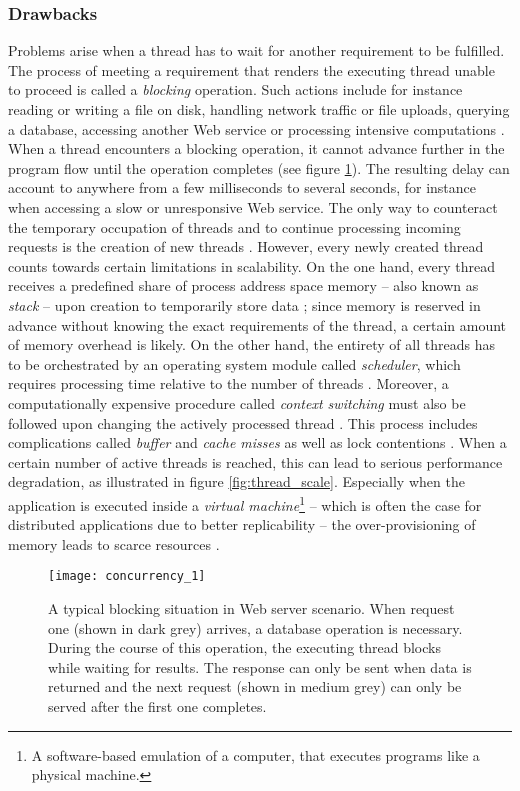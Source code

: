 \subsubsection*{Drawbacks}
Problems arise when a thread has to wait for another requirement to be fulfilled. The process of meeting a requirement that renders the executing thread unable to proceed is called a \textit{blocking} operation. Such actions include for instance reading or writing a file on disk, handling network traffic or file uploads, querying a database, accessing another Web service or processing intensive computations \cite[p. 196]{Henderson2006}. When a thread encounters a blocking operation, it cannot advance further in the program flow until the operation completes (see figure \ref{fig:concurrency_1}). The resulting delay can account to anywhere from a few milliseconds to several seconds, for instance when accessing a slow or unresponsive Web service. The only way to counteract the temporary occupation of threads and to continue processing incoming requests is the creation of new threads \cite[p. 36]{Hughes-Croucher2012}. However, every newly created thread counts towards certain limitations in scalability. On the one hand, every thread receives a predefined share of process address space memory -- also known as \textit{stack} -- upon creation to temporarily store data \cite{Russinovich}; since memory is reserved in advance without knowing the exact requirements of the thread, a certain amount of memory overhead is likely. On the other hand, the entirety of all threads has to be orchestrated by an operating system module called \textit{scheduler}, which requires processing time relative to the number of threads \cite{Russinovich}. Moreover, a computationally expensive procedure called \textit{context switching} must also be followed upon changing the actively processed thread \cite{threads_vs_events}. This process includes complications called \textit{buffer} and \textit{cache misses} as well as lock contentions \cite[p. 2]{Welsh2001}. When a certain number of active threads is reached, this can lead to serious performance degradation, as illustrated in figure \ref{fig:thread_scale}. Especially when the application is executed inside a \textit{virtual machine}\footnote{A software-based emulation of a computer, that executes programs like a physical machine.} -- which is often the case for distributed applications due to better replicability -- the over-provisioning of memory leads to scarce resources \cite[p. 1]{Haller2006}.

\begin{figure}
\centering\small
\setlength{\tabcolsep}{0mm}
  \texttt{[image: concurrency\_1]}
\caption{
A typical blocking situation in Web server scenario. When request one (shown in dark grey) arrives, a database operation is necessary. During the course of this operation, the executing thread blocks while waiting for results. The response can only be sent when data is returned and the next request (shown in medium grey) can only be served after the first one completes.
}
\label{fig:concurrency_1}
\end{figure}

